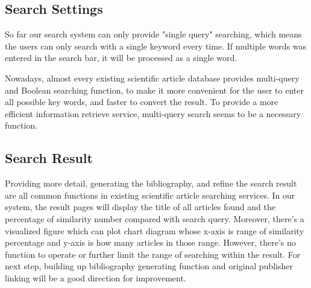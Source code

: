 \subsection{Search Settings}

So far our search system can only provide "single query" searching, which means the users can only search with a single keyword every time.
If multiple words was entered in the search bar, it will be processed as a single word.

Nowadays, almost every existing scientific article database provides multi-query and Boolean searching function,
to make it more convenient for the user to enter all possible key words,
and faster to convert the result.
To provide a more efficient information retrieve service,
multi-query search seems to be a necessary function.

\subsection{Search Result}
Providing more detail, generating the bibliography, and refine the search result are all common functions in existing scientific article searching services.
In our system, the result pages will display the title of all articles found and the percentage of similarity number compared with search query.
Moreover, there's a visualized figure which can plot chart diagram whose x-axis is range of similarity percentage and y-axis is how many articles in those range.
However, there's no function to operate or further limit the range of searching within the result.
For next step,
building up bibliography generating function and original publisher linking will be a good direction for improvement.

